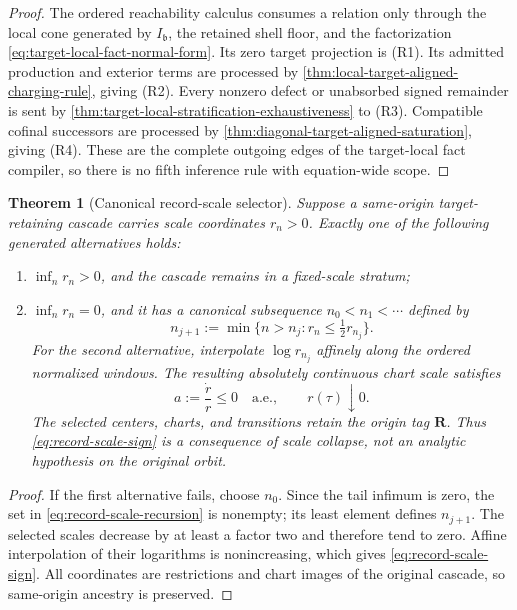 \documentclass[11pt]{article}
\numberwithin{section}{part}
\theoremstyle{plain}
\newtheorem{theorem}{Theorem}[section]
\theoremstyle{definition}
\theoremstyle{remark}
\begin{document}
\begin{proof}
The ordered reachability calculus consumes a relation only through the local
cone generated by \(I_{\mathfrak b}\), the retained shell floor, and the
factorization \eqref{eq:target-local-fact-normal-form}.  Its zero target
projection is \textup{(R1)}.  Its admitted production and exterior terms are
processed by \cref{thm:local-target-aligned-charging-rule}, giving
\textup{(R2)}.  Every nonzero defect or unabsorbed signed remainder is sent by
\cref{thm:target-local-stratification-exhaustiveness} to \textup{(R3)}.
Compatible cofinal successors are processed by
\cref{thm:diagonal-target-aligned-saturation}, giving \textup{(R4)}.
These are the complete outgoing edges of the target-local fact compiler, so
there is no fifth inference rule with equation-wide scope.
\end{proof}

\begin{theorem}[Canonical record-scale selector]
\label{thm:canonical-record-scale-selector}
Suppose a same-origin target-retaining cascade carries scale coordinates
\(r_n>0\).  Exactly one of the following generated alternatives holds:
\begin{enumerate}[label=\textup{(S\arabic*)}]
\item \(\inf_n r_n>0\), and the cascade remains in a fixed-scale stratum;
\item \(\inf_n r_n=0\), and it has a canonical subsequence
\(n_0<n_1<\cdots\) defined by
\begin{equation}
 \label{eq:record-scale-recursion}
 n_{j+1}:=\min\{n>n_j:r_n\le\tfrac12 r_{n_j}\}.
\end{equation}
For the second alternative, interpolate \(\log r_{n_j}\) affinely along the
ordered normalized windows.  The resulting absolutely continuous chart scale
satisfies
\begin{equation}
 \label{eq:record-scale-sign}
 a:=\frac{\dot r}{r}\le0
 \quad\text{a.e.},
 \qquad r(\tau)\downarrow0.
\end{equation}
The selected centers, charts, and transitions retain the origin tag
\(\mathbf R\).  Thus \eqref{eq:record-scale-sign} is a consequence of scale
collapse, not an analytic hypothesis on the original orbit.
\end{enumerate}
\end{theorem}

\begin{proof}
If the first alternative fails, choose \(n_0\).  Since the tail infimum is
zero, the set in \eqref{eq:record-scale-recursion} is nonempty; its least
element defines \(n_{j+1}\).  The selected scales decrease by at least a
factor two and therefore tend to zero.  Affine interpolation of their
logarithms is nonincreasing, which gives
\eqref{eq:record-scale-sign}.  All coordinates are restrictions and chart
images of the original cascade, so same-origin ancestry is preserved.
\end{proof}
\end{document}
